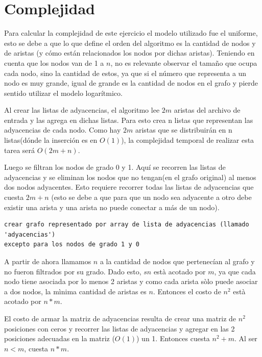 \documentclass[a4paper,11pt] {article}
\begin{document}

\section*{Complejidad}

Para calcular la complejidad de este ejercicio el modelo utilizado fue el uniforme, esto se debe a que lo que define el orden del algoritmo es la cantidad de nodos y de aristas (y cómo están relacionados los nodos  por dichas aristas). Teniendo en cuenta que los nodos van de 1 a $n$, no es relevante observar el tamaño que ocupa cada nodo, sino la cantidad de estos, ya que si el número que representa a un nodo es muy grande, igual de grande es la cantidad de nodos en el grafo y pierde sentido utilizar el modelo logarítmico.

\bigskip
Al crear las listas de adyacencias, el algoritmo lee $2m$ aristas del archivo de entrada y las agrega en dichas listas. Para esto crea n listas que representan las adyacencias de cada nodo. Como hay $2m$ aristas que se distribuirán en n listas(dónde la inserción es en $O(1)$), la complejidad temporal de realizar esta tarea será $O(2m + n)$.

Luego se filtran los nodos de grado 0 y 1. Aquí se recorren las listas de adyacencias y se eliminan los nodos que no tengan(en el grafo original) al menos dos nodos adyacentes. Esto requiere recorrer todas las listas de adyacencias que cuesta $2m + n$ (esto se debe a que para que un nodo sea adyacente a otro debe existir una arista y una arista no puede conectar a más de un nodo).

\begin{verbatim}
crear grafo representado por array de lista de adyacencias (llamado 'adyacencias')
excepto para los nodos de grado 1 y 0
\end{verbatim}

A partir de ahora llamamos $n$ a la cantidad de nodos que pertenecían al grafo y no fueron filtrados por su grado.
Dado esto, $sn$  està acotado por  $m$, ya que cada nodo tiene asociada por lo menos 2 aristas y como cada arista sòlo puede asociar a dos nodos, la mìnima cantidad de aristas es $n$. Entonces el costo de $n^2$ està acotado por $n*m$.

\bigskip

El costo de armar la matriz de adyacencias resulta de crear una matriz de $n^2$ posiciones con ceros y recorrer las listas de adyacencias y agregar en las 2 posiciones adecuadas en la matriz ($O(1)$) un 1. Entonces cuesta $n^2+m$. Al ser $n<m$, cuesta $n*m$.
\end{document}
